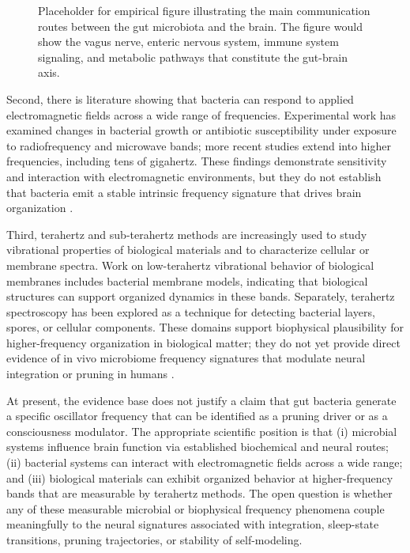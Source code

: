 \documentclass[12pt,letterpaper]{article}
\begin{document}
\begin{figure}[htbp]
\centering
{}
\caption{Placeholder for empirical figure illustrating the main communication routes between the gut microbiota and the brain. The figure would show the vagus nerve, enteric nervous system, immune system signaling, and metabolic pathways that constitute the gut-brain axis.}
\label{fig:placeholder_gutbrain}
\end{figure}

Second, there is literature showing that bacteria can respond to applied electromagnetic fields across a wide range of frequencies. Experimental work has examined changes in bacterial growth or antibiotic susceptibility under exposure to radiofrequency and microwave bands; more recent studies extend into higher frequencies, including tens of gigahertz. These findings demonstrate sensitivity and interaction with electromagnetic environments, but they do not establish that bacteria emit a stable intrinsic frequency signature that drives brain organization \cite{salmen2017hfemf, hegazy2025scirep}.

Third, terahertz and sub-terahertz methods are increasingly used to study vibrational properties of biological materials and to characterize cellular or membrane spectra. Work on low-terahertz vibrational behavior of biological membranes includes bacterial membrane models, indicating that biological structures can support organized dynamics in these bands. Separately, terahertz spectroscopy has been explored as a technique for detecting bacterial layers, spores, or cellular components. These domains support biophysical plausibility for higher-frequency organization in biological matter; they do not yet provide direct evidence of in vivo microbiome frequency signatures that modulate neural integration or pruning in humans \cite{luyet2023lowthzmembranes, datta2018spores}.

At present, the evidence base does not justify a claim that gut bacteria generate a specific oscillator frequency that can be identified as a pruning driver or as a consciousness modulator. The appropriate scientific position is that (i) microbial systems influence brain function via established biochemical and neural routes; (ii) bacterial systems can interact with electromagnetic fields across a wide range; and (iii) biological materials can exhibit organized behavior at higher-frequency bands that are measurable by terahertz methods. The open question is whether any of these measurable microbial or biophysical frequency phenomena couple meaningfully to the neural signatures associated with integration, sleep-state transitions, pruning trajectories, or stability of self-modeling.
\end{document}

